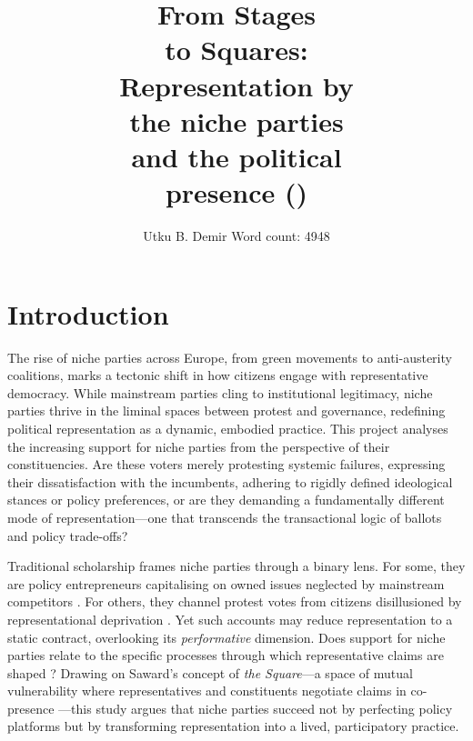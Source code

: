 
\usepackage{syntonly}
\usepackage{titlesec}
\setcounter{tocdepth}{2}
\setcounter{secnumdepth}{2}
\title{From Stages\\to Squares:\\Representation by\\the niche parties\\and the
political\\presence ()}
\author{Utku B. Demir \newline \small{Word count: 4948} }

\maketitle
\tableofcontents


\chapter{Introduction}\label{chap:Introduction} %

The rise of niche parties across Europe, from green movements to anti-austerity coalitions, marks a tectonic shift in how citizens engage with representative democracy. While mainstream parties cling to institutional legitimacy, niche parties thrive in the liminal spaces between protest and governance, redefining political representation as a dynamic, embodied practice. This project analyses the increasing support for niche parties from the perspective of their constituencies. Are these voters merely protesting systemic failures, expressing their dissatisfaction with the incumbents, adhering to rigidly defined ideological stances or policy preferences, or are they demanding a fundamentally different mode of representation—one that transcends the transactional logic of ballots and policy trade-offs?

Traditional scholarship frames niche parties through a binary lens. For some, they are policy entrepreneurs capitalising on owned issues neglected by mainstream competitors \parencite{meguid2005}. For others, they channel protest votes from citizens disillusioned by representational deprivation \parencite{nonnemacher2023}. Yet such accounts may reduce representation to a static contract, overlooking its \textit{performative} dimension. Does support for niche parties relate to the specific processes through which representative claims are shaped \parencite{saward2010}? Drawing on Saward’s concept of \textit{the Square}—a space of mutual vulnerability where representatives and constituents negotiate claims in co-presence \parencite[5]{saward2024}—this study argues that niche parties succeed not by perfecting policy platforms but by transforming representation into a lived, participatory practice.

